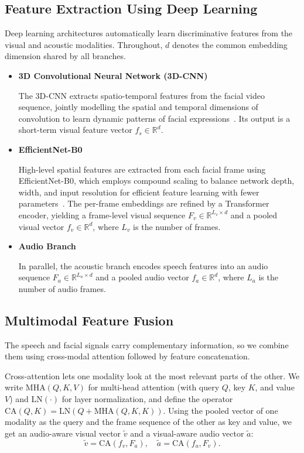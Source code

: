 \documentclass[conference]{IEEEtran}
\begin{document}
\subsection{Feature Extraction Using Deep Learning}

Deep learning architectures automatically learn discriminative features from the visual and acoustic modalities. Throughout, $d$ denotes the common embedding dimension shared by all branches.

\begin{itemize}

\item \textbf{3D Convolutional Neural Network (3D-CNN)}

The 3D-CNN extracts spatio-temporal features from the facial video sequence, jointly modelling the spatial and temporal dimensions of convolution to learn dynamic patterns of facial expressions~\cite{ref7}. Its output is a short-term visual feature vector $f_s \in \mathbb{R}^{d}$.

\item \textbf{EfficientNet-B0}

High-level spatial features are extracted from each facial frame using EfficientNet-B0, which employs compound scaling to balance network depth, width, and input resolution for efficient feature learning with fewer parameters~\cite{ref6}. The per-frame embeddings are refined by a Transformer encoder, yielding a frame-level visual sequence $F_v \in \mathbb{R}^{L_v \times d}$ and a pooled visual vector $f_v \in \mathbb{R}^{d}$, where $L_v$ is the number of frames.

\item \textbf{Audio Branch}

In parallel, the acoustic branch encodes speech features into an audio sequence $F_a \in \mathbb{R}^{L_a \times d}$ and a pooled audio vector $f_a \in \mathbb{R}^{d}$, where $L_a$ is the number of audio frames.

\end{itemize}

\subsection{Multimodal Feature Fusion}

The speech and facial signals carry complementary information, so we combine them using cross-modal attention followed by feature concatenation.

Cross-attention lets one modality look at the most relevant parts of the other. We write $\mathrm{MHA}(Q,K,V)$ for multi-head attention (with query $Q$, key $K$, and value $V$) and $\mathrm{LN}(\cdot)$ for layer normalization, and define the operator $\mathrm{CA}(Q,K)=\mathrm{LN}(Q+\mathrm{MHA}(Q,K,K))$. Using the pooled vector of one modality as the query and the frame sequence of the other as key and value, we get an audio-aware visual vector $\tilde{v}$ and a visual-aware audio vector $\tilde{a}$:
\begin{equation}
\tilde{v} = \mathrm{CA}(f_v, F_a), \quad \tilde{a} = \mathrm{CA}(f_a, F_v).
\end{equation}
\end{document}
